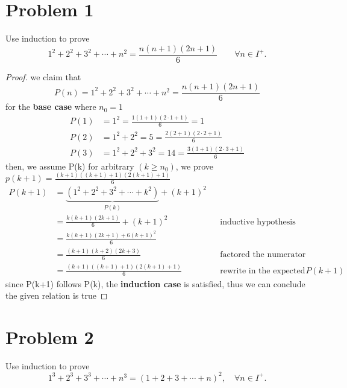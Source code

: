 \newcommand{\hmwkTitle}{Homework 2}
\newcommand{\hmwkDueDate}{Monday, January 11, 2016}
\newcommand{\hmwkHeaderTitle}{ICCS206 Discrete Mathematic: Homework 2}


\section*{Problem 1}
Use induction to prove
\[
1^2 + 2^2 + 3^2 + \cdots + n^2 = \frac{n(n+1)(2n+1)}{6}\qquad \forall n \in I^+.
\]
\medskip
\solution

 \begin{proof}

    we claim that
    \[
    P(n) = 1^2 + 2^2 + 3^2 + \cdots + n^2 = \frac{n(n+1)(2n+1)}{6}
    \]
    for the \textbf{base case} where $n_0 = 1$
    \[
    \begin{aligned}
    P(1) &= 1^2 = \frac{1(1+1)(2\cdot 1 + 1)}{6} = 1 \\
    P(2) &= 1^2 + 2^2 = 5 = \frac{2(2+1)(2\cdot 2 + 1)}{6} \\
    P(3) &= 1^2 + 2^2 + 3^2 = 14 = \frac{3(3+1)(2\cdot 3 + 1)}{6} 
    \end{aligned}
    \]
    then, we assume P(k) for arbitrary $(k \ge n_0)$, we prove $p(k+1)
  = \frac{(k+1)((k+1) + 1)(2(k+1) + 1)}{6}$
    \begin{align*}
    P(k+1) &= \underbrace{(1^2 + 2^2 + 3^2 + \cdots + k^2)}_{P(k)} +
  (k+1)^2\\
    &= \frac{k(k+1)(2k+1)}{6} + (k+1)^2 && \text{inductive hypothesis}\\
    &= \frac{k(k+1)(2k+1) + 6(k+1)^2}{6}\\
    &= \frac{(k+1)(k+2)(2k+3)}{6} && \text{factored the numerator}\\
    &= \frac{(k+1)((k+1) + 1)(2(k+1) + 1)}{6} && \text{rewrite in the expected form for } P(k+1)
    \end{align*}
    since P(k+1) follows P(k), the \textbf{induction case} is satisfied, thus we can conclude the given relation is true \end{proof}

\vspace{1em}
\hrulefill

\section*{Problem 2}
Use induction to prove
\[
1^3 + 2^3 + 3^3 + \cdots + n^3 = (1 + 2 + 3 + \cdots + n)^2, \quad \forall n \in I^+.
\]
\medskip
\solution

